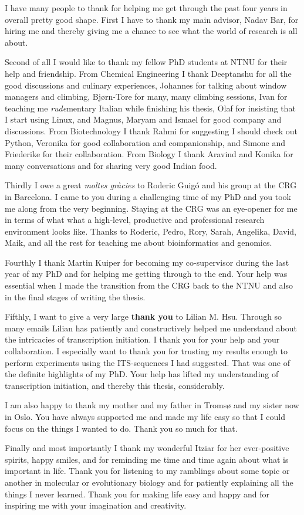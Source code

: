 I have many people to thank for helping me get through the past four years in
overall pretty good shape. First I have to thank my main advisor, Nadav Bar,
for hiring me and thereby giving me a chance to see what the world of research
is all about.

Second of all I would like to thank my fellow PhD students at NTNU for their
help and friendship. From Chemical Engineering I thank Deeptanshu for all the
good discussions and culinary experiences, Johannes for talking about window
managers and climbing, Bjørn-Tore for many, many climbing sessions, Ivan for
teaching me \textit{rude}mentary Italian while finishing his thesis, Olaf for
insisting that I start using Linux, and Magnus, Maryam and Ismael for good
company and discussions. From Biotechnology I thank Rahmi for suggesting I
should check out Python, Veronika for good collaboration and companionship, and
Simone and Friederike for their collaboration. From Biology I thank Aravind and
Konika for many conversations and for sharing very good Indian food.

Thirdly I owe a great \textit{moltes gràcies} to Roderic Guigó and his group at
the CRG in Barcelona. I came to you during a challenging time of my PhD and you
took me along from the very beginning. Staying at the CRG was an eye-opener for
me in terms of what what a high-level, productive and professional research
environment looks like. Thanks to Roderic, Pedro, Rory, Sarah, Angelika, David,
Maik, and all the rest for teaching me about bioinformatics and genomics.

Fourthly I thank Martin Kuiper for becoming my co-supervisor during the last
year of my PhD and for helping me getting through to the end. Your help was
essential when I made the transition from the CRG back to the NTNU and also in
the final stages of writing the thesis.

Fifthly, I want to give a very large \textbf{thank you} to Lilian M. Hsu.
Through so many emails Lilian has patiently and constructively helped me
understand about the intricacies of transcription initiation. I thank you for
your help and your collaboration. I especially want to thank you for trusting
my results enough to perform experiments using the ITS-sequences I had
suggested. That was one of the definite highlights of my PhD. Your help has
lifted my understanding of transcription initiation, and thereby this thesis,
considerably.

I am also happy to thank my mother and my father in Tromsø and my sister now in
Oslo. You have always supported me and made my life easy so that I could focus
on the things I wanted to do. Thank you so much for that.

Finally and most importantly I thank my wonderful Itziar for her ever-positive
spirits, happy smiles, and for reminding me time and time again about what is
important in life. Thank you for listening to my ramblings about some topic or
another in molecular or evolutionary biology and for patiently explaining all
the things I never learned. Thank you for making life easy and happy and for
inspiring me with your imagination and creativity.
